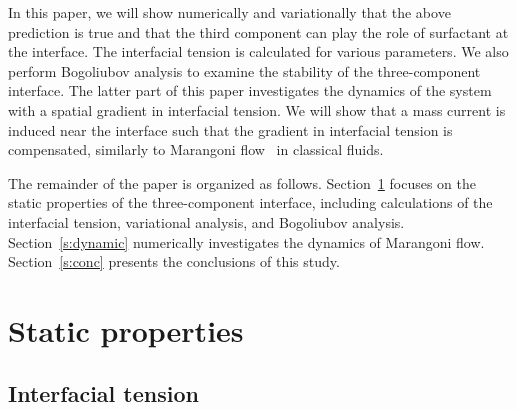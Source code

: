 \documentclass[pra,aps,superscriptaddress,twocolumn,color]{revtex4-1}
\begin{document}
In this paper, we will show numerically and variationally that the above
prediction is true and that the third component can play the role of
surfactant at the interface.
The interfacial tension is calculated for various parameters.
We also perform Bogoliubov analysis to examine the stability of the
three-component interface.
The latter part of this paper investigates the dynamics of the system with a
spatial gradient in interfacial tension.
We will show that a mass current is induced near the interface such that the
gradient in interfacial tension is compensated, similarly to Marangoni
flow~\cite{Marangoni} in classical fluids.

The remainder of the paper is organized as follows.
Section~\ref{s:static} focuses on the static properties of the
three-component interface, including calculations of the interfacial
tension, variational analysis, and Bogoliubov analysis.
Section~\ref{s:dynamic} numerically investigates the dynamics of Marangoni
flow.
Section~\ref{s:conc} presents the conclusions of this study.


\section{Static properties}
\label{s:static}

\subsection{Interfacial tension}
\label{s:interface}
\end{document}
